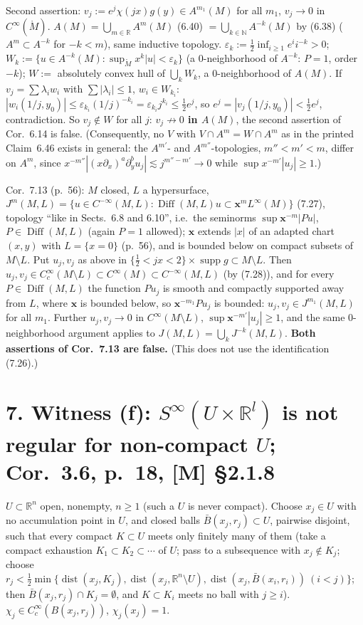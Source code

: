\documentclass[11pt]{article}
\newcommand{\R}{\mathbb{R}}
\newcommand{\N}{\mathbb{N}}
\newcommand{\supp}{\operatorname{supp}}
\newcommand{\Diff}{\operatorname{Diff}}
\newcommand{\Mo}{\mathring{M}}
\newcommand{\xb}{\boldsymbol x}
\DeclareMathOperator{\dist}{dist}
\begin{document}
Second assertion: $v_j:=e^j\chi(jx)g(y)\in A^{m_1}(M)$ for all $m_1$, $v_j\to0$ in $C^\infty(\Mo)$. $A(M)=\bigcup_{m\in\R}A^m(M)$ (6.40) $=\bigcup_{k\in\N}A^{-k}(M)$ by (6.38) ($A^m\subset A^{-k}$ for $-k<m$), same inductive topology. $\varepsilon_k:=\tfrac12\inf_{i\ge1}e^ii^{-k}>0$; $W_k:=\{u\in A^{-k}(M):\sup_{\Mo}x^k|u|<\varepsilon_k\}$ (a 0-neighborhood of $A^{-k}$: $P=1$, order $-k$); $W:=$ absolutely convex hull of $\bigcup_kW_k$, a 0-neighborhood of $A(M)$. If $v_j=\sum\lambda_iw_i$ with $\sum|\lambda_i|\le1$, $w_i\in W_{k_i}$: $|w_i(1/j,y_0)|\le\varepsilon_{k_i}(1/j)^{-k_i}=\varepsilon_{k_i}j^{k_i}\le\tfrac12e^j$, so $e^j=|v_j(1/j,y_0)|<\tfrac12e^j$, contradiction. So $v_j\notin W$ for all $j$: \textbf{$v_j\not\to0$ in $A(M)$}, the second assertion of Cor.~6.14 is false. (Consequently, no $V$ with $V\cap A^m=W\cap A^m$ as in the printed Claim~6.46 exists in general: the $A^{m'}$- and $A^{m''}$-topologies, $m''<m'<m$, differ on $A^m$, since $x^{-m''}|(x\partial_x)^a\partial_y^bu_j|\lesssim j^{m''-m'}\to0$ while $\sup x^{-m'}|u_j|\ge1$.)

Cor.~7.13 (p.~56): $M$ closed, $L$ a hypersurface, $J^m(M,L)=\{u\in C^{-\infty}(M,L):\Diff(M,L)u\subset\xb^mL^\infty(M)\}$ (7.27), topology ``like in Sects.~6.8 and 6.10'', i.e.\ the seminorms $\sup\xb^{-m}|Pu|$, $P\in\Diff(M,L)$ (again $P=1$ allowed); $\xb$ extends $|x|$ of an adapted chart $(x,y)$ with $L=\{x=0\}$ (p.~56), and is bounded below on compact subsets of $M\setminus L$. Put $u_j,v_j$ as above in $\{\tfrac12<jx<2\}\times\supp g\subset M\setminus L$. Then $u_j,v_j\in C_c^\infty(M\setminus L)\subset C^\infty(M)\subset C^{-\infty}(M,L)$ (by (7.28)), and for every $P\in\Diff(M,L)$ the function $Pu_j$ is smooth and compactly supported away from $L$, where $\xb$ is bounded below, so $\xb^{-m_1}Pu_j$ is bounded: $u_j,v_j\in J^{m_1}(M,L)$ for all $m_1$. Further $u_j,v_j\to0$ in $C^\infty(M\setminus L)$, $\sup\xb^{-m'}|u_j|\ge1$, and the same 0-neighborhood argument applies to $J(M,L)=\bigcup_kJ^{-k}(M,L)$. \textbf{Both assertions of Cor.~7.13 are false.} (This does not use the identification (7.26).)

\section*{7. Witness (f): $S^\infty(U\times\R^l)$ is not regular for non-compact $U$; Cor.~3.6, p.~18, [M] \S2.1.8}
$U\subset\R^n$ open, nonempty, $n\ge1$ (such a $U$ is never compact). Choose $x_j\in U$ with no accumulation point in $U$, and closed balls $\bar B(x_j,r_j)\subset U$, pairwise disjoint, such that every compact $K\subset U$ meets only finitely many of them (take a compact exhaustion $K_1\subset K_2\subset\cdots$ of $U$; pass to a subsequence with $x_j\notin K_j$; choose $r_j<\tfrac12\min\{\dist(x_j,K_j),\dist(x_j,\R^n\setminus U),\dist(x_j,\bar B(x_i,r_i))\ (i<j)\}$; then $\bar B(x_j,r_j)\cap K_j=\emptyset$, and $K\subset K_i$ meets no ball with $j\ge i$). $\chi_j\in C_c^\infty(B(x_j,r_j))$, $\chi_j(x_j)=1$.
\end{document}
